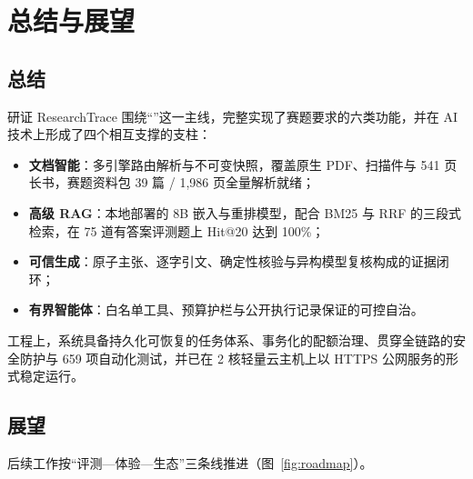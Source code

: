 \clearpage
\section{总结与展望}

\subsection{总结}

研证 ResearchTrace 围绕“”这一主线，完整实现了赛题要求的六类功能，并在 AI 技术上形成了四个相互支撑的支柱：

\begin{itemize}
  \item \textbf{文档智能}：多引擎路由解析与不可变快照，覆盖原生 PDF、扫描件与 541 页长书，赛题资料包 39 篇 / 1,986 页全量解析就绪；
  \item \textbf{高级 RAG}：本地部署的 8B 嵌入与重排模型，配合 BM25 与 RRF 的三段式检索，在 75 道有答案评测题上 Hit@20 达到 100\%；
  \item \textbf{可信生成}：原子主张、逐字引文、确定性核验与异构模型复核构成的证据闭环；
  \item \textbf{有界智能体}：白名单工具、预算护栏与公开执行记录保证的可控自治。
\end{itemize}

工程上，系统具备持久化可恢复的任务体系、事务化的配额治理、贯穿全链路的安全防护与 659 项自动化测试，并已在 2 核轻量云主机上以 HTTPS 公网服务的形式稳定运行。

\subsection{展望}

后续工作按“评测—体验—生态”三条线推进（图~\ref{fig:roadmap}）。

